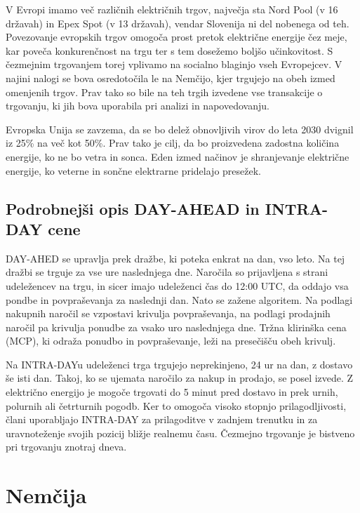 \documentclass[12pt,a4paper]{amsart}
\theoremstyle{definition} %
\theoremstyle{plain} %
\begin{document}
{V Evropi imamo več različnih električnih trgov, največja sta Nord Pool (v 16 državah) in Epex Spot (v 13 državah), vendar Slovenija ni del nobenega od teh. 
Povezovanje evropskih trgov omogoča prost pretok električne energije čez meje, kar poveča konkurenčnost na trgu ter s tem dosežemo boljšo učinkovitost. S čezmejnim trgovanjem torej vplivamo na socialno blaginjo vseh Evropejcev.
V najini nalogi se bova osredotočila le na 
Nemčijo, kjer trgujejo na obeh izmed omenjenih trgov. Prav tako so bile na teh trgih izvedene vse transakcije o trgovanju, ki jih bova uporabila pri analizi in napovedovanju.  





Evropska Unija se zavzema, da se bo delež obnovljivih virov do leta 2030 dvignil iz 25\% na več kot 50\%. Prav tako je cilj, da bo proizvedena zadostna količina energije, ko ne bo vetra in sonca. 
Eden izmed načinov je shranjevanje električne energije, ko veterne in sončne elektrarne pridelajo presežek. 


\subsection*{Podrobnejši opis DAY-AHEAD in INTRA-DAY cene}

DAY-AHED se upravlja prek dražbe, ki poteka enkrat na dan, vso leto. Na tej dražbi se trguje za vse ure naslednjega dne. Naročila so prijavljena s strani udeležencev na trgu, 
in sicer imajo udeleženci čas do 12:00 UTC, da oddajo vsa pondbe in povpraševanja za naslednji dan. Nato se zažene algoritem. Na podlagi nakupnih naročil se vzpostavi krivulja povpraševanja, na podlagi prodajnih naročil pa krivulja ponudbe za vsako uro naslednjega dne. Tržna klirinška cena (MCP), ki odraža ponudbo in povpraševanje, leži na presečišču obeh krivulj.


Na INTRA-DAYu udeleženci trga trgujejo neprekinjeno, 24 ur na dan, z dostavo še isti dan. Takoj, ko se ujemata naročilo za nakup in prodajo, se posel izvede. Z električno energijo je mogoče trgovati do 5 minut pred dostavo in prek urnih, polurnih ali četrturnih pogodb. Ker to omogoča visoko stopnjo prilagodljivosti, člani uporabljajo INTRA-DAY za prilagoditve v zadnjem trenutku in za uravnoteženje svojih pozicij bližje realnemu času. Čezmejno trgovanje je bistveno pri trgovanju znotraj dneva. 



\section*{Nemčija}

}
\end{document}
